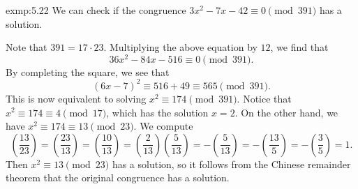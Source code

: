 \begin{exmp}{exmp:5.22}
    We can check if the congruence $3x^2 - 7x - 42 \equiv 0 \pmod{391}$ has a solution. 

    Note that $391 = 17 \cdot 23$. Multiplying the above equation by $12$, we find that 
    \[ 36x^2 - 84x - 516 \equiv 0 \pmod{391}. \] 
    By completing the square, we see that  
    \[ (6x - 7)^2 \equiv 516 + 49 \equiv 565 \pmod{391}. \] 
    This is now equivalent to solving $x^2 \equiv 174 \pmod{391}$. Notice that 
    $x^2 \equiv 174 \equiv 4 \pmod{17}$, which has the solution $x = 2$. 
    On the other hand, we have $x^2 \equiv 174 \equiv 13 \pmod{23}$. We compute 
    \[ \left( \frac{13}{23} \right) = \left( \frac{23}{13} \right) = 
    \left( \frac{10}{13} \right) = \left( \frac{2}{13} \right) 
    \left( \frac{5}{13} \right) = -\left( \frac{5}{13} \right) = 
    -\left( \frac{13}{5} \right) = -\left(\frac{3}{5} \right) = 1. \] 
    Then $x^2 \equiv 13 \pmod{23}$ has a solution, so it follows from the 
    Chinese remainder theorem that the original congruence has a solution. 
\end{exmp}